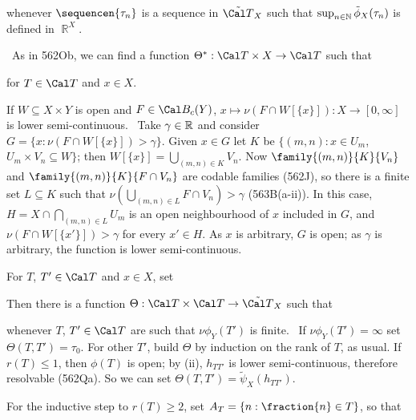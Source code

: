 {

\noindent whenever $\sequencen{\tau_n}$ is a sequence in
$\tilde{\Cal T}_X$ such that $\sup_{n\in\Bbb N}\tilde\phi_X(\tau_n)$ is
defined in $\BbbR^X$.

\medskip

\qquad\grheade\ As in 562Ob,
we can find a function $\Theta^*:\Cal T\times X\to\Cal T$ such that


\noindent for $T\in\Cal T$ and $x\in X$.

\medskip

 If $W\subseteq X\times Y$ is open and $F\in\Cal B_c(Y)$,
$x\mapsto\nu(F\cap W[\{x\}]):X\to[0,\infty]$ is lower semi-continuous.
\Prf\ Take $\gamma\in\Bbb R$ and consider
$G=\{x:\nu(F\cap W[\{x\}])>\gamma\}$.
Given $x\in G$ let $K$ be $\{(m,n):x\in U_m$, $U_m\times V_n\subseteq W\}$;
then $W[\{x\}]=\bigcup_{(m,n)\in K}V_n$.   Now $\family{(m,n)}{K}{V_n}$ and
$\family{(m,n)}{K}{F\cap V_n}$ are codable families (562J),
so there is a finite set
$L\subseteq K$ such that $\nu(\bigcup_{(m,n)\in L}F\cap V_n)>\gamma$
(563B(a-ii)).   In this case,
$H=X\cap\bigcap_{(m,n)\in L}U_m$ is an open neighbourhood of $x$ included
in $G$, and $\nu(F\cap W[\{x'\}])>\gamma$ for every $x'\in H$.
As $x$ is arbitrary, $G$ is open;  as $\gamma$ is arbitrary, the
function is lower semi-continuous.\ \Qed

\medskip

 For $T$, $T'\in\Cal T$ and $x\in X$, set


\noindent Then there is a function
$\Theta:\Cal T\times\Cal T\to\tilde{\Cal T}_X$ such that


\noindent whenever $T$, $T'\in\Cal T$ are such that
$\nu\phi_Y(T')$ is finite.   \Prf\
If $\nu\phi_Y(T')=\infty$ set $\Theta(T,T')=\tau_0$.
For other $T'$, build $\Theta$ by
induction on the rank of $T$, as usual.
If $r(T)\le 1$, then $\phi(T)$ is open;  by (ii), $h_{TT'}$ is
lower semi-continuous, therefore resolvable (562Qa).   So we can set
$\Theta(T,T')=\tilde\psi_X(h_{TT'})$.

For the inductive step to $r(T)\ge 2$, set
$A_T=\{n:\fraction{n}\in T\}$, so that

}
